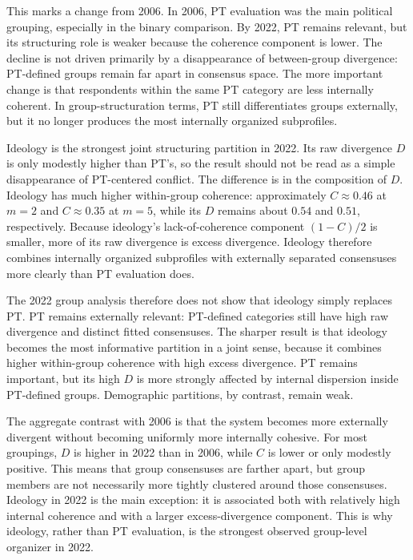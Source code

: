 \documentclass[12pt]{article}
\begin{document}
This marks a change from 2006. In 2006, PT evaluation was the main political
grouping, especially in the binary comparison. By 2022, PT remains relevant,
but its structuring role is weaker because the coherence component is lower.
The decline is not driven primarily by a disappearance of between-group
divergence: PT-defined groups remain far apart in consensus space. The more
important change is that respondents within the same PT category are less
internally coherent. In group-structuration terms, PT still differentiates
groups externally, but it no longer produces the most internally organized
subprofiles.

Ideology is the strongest joint structuring partition in 2022. Its raw
divergence \(D\) is only modestly higher than PT's, so the result should not
be read as a simple disappearance of PT-centered conflict. The difference is in
the composition of \(D\). Ideology has much higher within-group coherence:
approximately \(C \approx 0.46\) at \(m=2\) and \(C \approx 0.35\) at
\(m=5\), while its \(D\) remains about \(0.54\) and \(0.51\), respectively.
Because ideology's lack-of-coherence component \((1-C)/2\) is smaller, more
of its raw divergence is excess divergence. Ideology therefore combines
internally organized subprofiles with externally separated consensuses more
clearly than PT evaluation does.

The 2022 group analysis therefore does not show that ideology simply replaces
PT. PT remains externally relevant: PT-defined categories still have high raw
divergence and distinct fitted consensuses. The sharper result is that
ideology becomes the most informative partition in a joint sense, because it
combines higher within-group coherence with high excess divergence. PT remains
important, but its high \(D\) is more strongly affected by internal dispersion
inside PT-defined groups. Demographic partitions, by contrast, remain weak.

The aggregate contrast with 2006 is that the system becomes more externally
divergent without becoming uniformly more internally cohesive. For most
groupings, \(D\) is higher in 2022 than in 2006, while \(C\) is lower or only
modestly positive. This means that group consensuses are farther apart, but
group members are not necessarily more tightly clustered around those
consensuses. Ideology in 2022 is the main exception: it is associated both
with relatively high internal coherence and with a larger excess-divergence
component. This is why ideology, rather than PT evaluation, is the strongest
observed group-level organizer in 2022.
\end{document}
